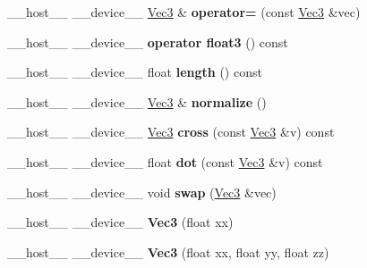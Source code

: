 \begin{DoxyCompactItemize}
\item 
\+\_\+\+\_\+host\+\_\+\+\_\+ \+\_\+\+\_\+device\+\_\+\+\_\+ \hyperlink{class_vec3}{Vec3} \& {\bfseries operator=} (const \hyperlink{class_vec3}{Vec3} \&vec)\hypertarget{class_vec3_abd0c90cf6cc28577248e9ae86d72d5a9}{}\label{class_vec3_abd0c90cf6cc28577248e9ae86d72d5a9}

\item 
\+\_\+\+\_\+host\+\_\+\+\_\+ \+\_\+\+\_\+device\+\_\+\+\_\+ {\bfseries operator float3} () const\hypertarget{class_vec3_afa3f84872dfa8c04bed556854730e6a9}{}\label{class_vec3_afa3f84872dfa8c04bed556854730e6a9}

\item 
\+\_\+\+\_\+host\+\_\+\+\_\+ \+\_\+\+\_\+device\+\_\+\+\_\+ float {\bfseries length} () const\hypertarget{class_vec3_a12cbc93353a9dc6c9ea5e4b2977fc865}{}\label{class_vec3_a12cbc93353a9dc6c9ea5e4b2977fc865}

\item 
\+\_\+\+\_\+host\+\_\+\+\_\+ \+\_\+\+\_\+device\+\_\+\+\_\+ \hyperlink{class_vec3}{Vec3} \& {\bfseries normalize} ()\hypertarget{class_vec3_aaeb17c15d3cbdc7e3d8981b7f0f49b51}{}\label{class_vec3_aaeb17c15d3cbdc7e3d8981b7f0f49b51}

\item 
\+\_\+\+\_\+host\+\_\+\+\_\+ \+\_\+\+\_\+device\+\_\+\+\_\+ \hyperlink{class_vec3}{Vec3} {\bfseries cross} (const \hyperlink{class_vec3}{Vec3} \&v) const\hypertarget{class_vec3_a7dbe7c404cdda8d7f40c398b2fd2eeba}{}\label{class_vec3_a7dbe7c404cdda8d7f40c398b2fd2eeba}

\item 
\+\_\+\+\_\+host\+\_\+\+\_\+ \+\_\+\+\_\+device\+\_\+\+\_\+ float {\bfseries dot} (const \hyperlink{class_vec3}{Vec3} \&v) const\hypertarget{class_vec3_aabc0167d8027104b5b9d7380cdda9b66}{}\label{class_vec3_aabc0167d8027104b5b9d7380cdda9b66}

\item 
\+\_\+\+\_\+host\+\_\+\+\_\+ \+\_\+\+\_\+device\+\_\+\+\_\+ void {\bfseries swap} (\hyperlink{class_vec3}{Vec3} \&vec)\hypertarget{class_vec3_a03632ba5412c9f2048004e2f208d7bb4}{}\label{class_vec3_a03632ba5412c9f2048004e2f208d7bb4}

\item 
\+\_\+\+\_\+host\+\_\+\+\_\+ \+\_\+\+\_\+device\+\_\+\+\_\+ {\bfseries Vec3} (float xx)\hypertarget{class_vec3_ab76e7b1dfb13878ef79e295bb4e7444b}{}\label{class_vec3_ab76e7b1dfb13878ef79e295bb4e7444b}

\item 
\+\_\+\+\_\+host\+\_\+\+\_\+ \+\_\+\+\_\+device\+\_\+\+\_\+ {\bfseries Vec3} (float xx, float yy, float zz)\hypertarget{class_vec3_a7d4737059c28fa7c8c3db22ba4718178}{}\label{class_vec3_a7d4737059c28fa7c8c3db22ba4718178}


\end{DoxyCompactItemize}
